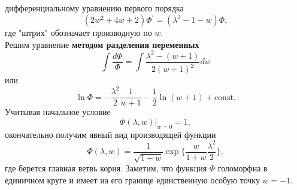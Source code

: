 \documentclass[12pt,a4paper]{article}
\theoremstyle{plain}   \newtheorem{Pro}{Задача}
\begin{document}
дифференциальному уравнению первого порядка
$$
  (2w^2 +4w +2)\Phi ^{\prime}=(\lambda ^2 -1 -w)\Phi ,
$$
где "штрих" обозначает производную по
$ w. $
\\
Решим уравнение
{\bfseries методом разделения переменных}
$$
  \int \frac{d\Phi}{\Phi}=
  \int \frac{\lambda ^2 -(w+1)}{2(w+1)^2}dw
$$
или
$$
  \ln \Phi =-\frac{\lambda ^2}{2}\frac{1}{w+1}
  -\frac{1}{2}\ln (w+1) + \mathrm{const}.
$$
Учитывая начальное условие
$$
  \Phi (\lambda , w) \biggr | _{w=0}=1,
$$
окончательно получим явный вид производящей функции
$$
  \Phi (\lambda ,w)=\frac{1}{\sqrt{1+w}}
  \exp \Biggl \{ \frac{w}{1+w}\frac{\lambda ^2}{2}
  \Biggr \} ,
$$
где берется главная ветвь корня. Заметим, что функция
$ \Phi $
голоморфна в единичном круге и имеет на его границе единственную
особую точку
$ w=-1. $
\\
\end{document}
